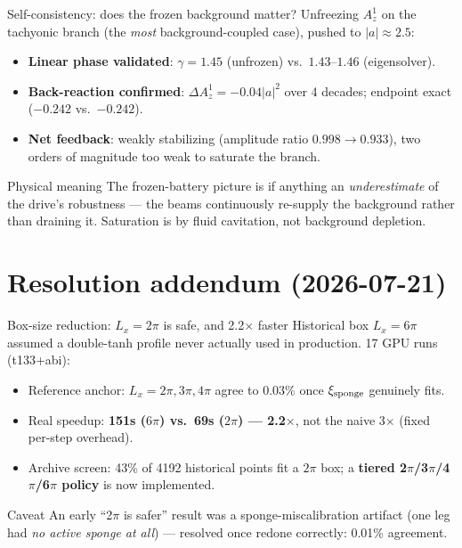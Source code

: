 \documentclass[aspectratio=169,11pt]{beamer}
\newenvironment{physmeaning}{\begin{exampleblock}{Physical meaning}}{\end{exampleblock}}
\newenvironment{caveat}{\begin{alertblock}{Caveat}}{\end{alertblock}}
\begin{document}
\begin{frame}{Self-consistency: does the frozen background matter?}
Unfreezing $A_z^1$ on the tachyonic branch (the \emph{most} background-coupled
case), pushed to $|a|\approx2.5$:
\begin{itemize}
\item \textbf{Linear phase validated}: $\gamma=1.45$ (unfrozen) vs.\ $1.43$--$1.46$
(eigensolver).
\item \textbf{Back-reaction confirmed}: $\Delta A_z^1=-0.04|a|^2$ over 4 decades;
endpoint exact ($-0.242$ vs.\ $-0.242$).
\item \textbf{Net feedback}: weakly stabilizing (amplitude ratio $0.998\to0.933$),
two orders of magnitude too weak to saturate the branch.
\end{itemize}
\begin{physmeaning}
The frozen-battery picture is if anything an \emph{underestimate} of the drive's
robustness — the beams continuously re-supply the background rather than
draining it. Saturation is by fluid cavitation, not background depletion.
\end{physmeaning}
\end{frame}

\section{Resolution addendum (2026-07-21)}

\begin{frame}{Box-size reduction: $L_x=2\pi$ is safe, and 2.2$\times$ faster}
\footnotesize
Historical box $L_x=6\pi$ assumed a double-tanh profile never actually used in
production. 17 GPU runs (t133+abi):
\begin{itemize}
\item Reference anchor: $L_x=2\pi,3\pi,4\pi$ agree to 0.03\% once
$\xi_{\rm sponge}$ genuinely fits.
\item Real speedup: \textbf{151s ($6\pi$) vs.\ 69s ($2\pi$) — 2.2$\times$}, not
the naive 3$\times$ (fixed per-step overhead).
\item Archive screen: 43\% of 4192 historical points fit a $2\pi$ box; a
\textbf{tiered 2$\pi$/3$\pi$/4$\pi$/6$\pi$ policy} is now implemented.
\end{itemize}
\begin{caveat}
An early ``2$\pi$ is safer'' result was a sponge-miscalibration artifact (one leg
had \emph{no active sponge at all}) — resolved once redone correctly: 0.01\%
agreement.
\end{caveat}
\end{frame}
\end{document}
